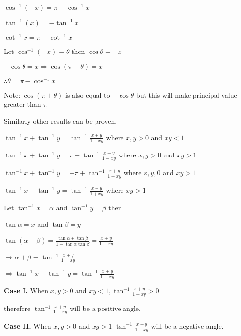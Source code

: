     \item $\cos^{-1}(-x) = \pi - \cos^{-1}x$

    \item $\tan^{-1}(x) = -\tan^{-1}x$

    \item $\cot^{-1}x = \pi - \cot^{-1}x$
  \stopitemize
\stoptheorem

\startproof
  Let $\cos^{-1}(-x) = \theta$ then $\cos\theta = -x$

  $-\cos\theta = x \Rightarrow \cos(\pi - \theta) = x$

  $\therefore \theta = \pi - \cos^{-1}x$

  Note: $\cos(\pi + \theta)$ is also equal to $-\cos\theta$ but this will make principal value greater than $\pi.$

  Similarly other results can be proven.
\stopproof

\starttheorem
  \startitemize[n]
  \item $\tan^{-1}x + \tan^{-1}y = \tan^{-1}\frac{x + y}{1 - xy}$ where $x, y > 0$ and $xy < 1$

  \item $\tan^{-1}x + \tan^{-1}y = \pi + \tan^{-1}\frac{x + y}{1 - xy}$ where $x, y > 0$ and $xy > 1$

  \item $\tan^{-1}x + \tan^{-1}y = -\pi + \tan^{-1}\frac{x + y}{1 - xy}$ where $x, y , 0$ and $xy > 1$

  \item $\tan^{-1}x - \tan^{-1}y = \tan^{-1}\frac{x - y}{1 + xy}$ where $xy > 1$
  \stopitemize
\stoptheorem

\startproof
  Let $\tan^{-1}x = \alpha$ and $\tan^{-1}y = \beta$ then

  $\tan\alpha = x$ and $\tan\beta = y$

  $\tan(\alpha + \beta) = \frac{\tan\alpha + \tan\beta}{1 - \tan\alpha\tan\beta} = \frac{x + y}{1 - xy}$

  $\Rightarrow \alpha +\beta = \tan^{-1}\frac{x + y}{1 = xy}$

  $\Rightarrow \tan^{-1}x + \tan^{-1}y = \tan^{-1}\frac{x + y}{1 - xy}$

  {\bf Case I.} When $x, y > 0$ and $xy < 1, \tan^{-1}\frac{x + y}{1 - xy} > 0$

  therefore $\tan^{-1}\frac{x + y}{1 - xy}$ will be a positive angle.

  {\bf Case II.} When $x, y >0$ and $xy > 1$ $\tan^{-1}\frac{x + y}{1 - xy}$ will be a negative angle.

